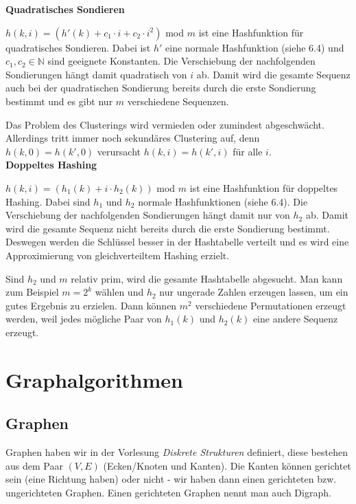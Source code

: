 \documentclass[12pt]{article}
\begin{document}
\textbf{Quadratisches Sondieren}

$h(k, i) = (h'(k) + c_1 \cdot{} i + c_2 \cdot{} i^2)$ mod $m$ ist eine Hashfunktion für quadratisches Sondieren. Dabei ist $h'$ eine normale Hashfunktion (siehe 6.4) und $c_1, c_2 \in \mathbb{N}$ sind geeignete Konstanten. Die Verschiebung der nachfolgenden Sondierungen hängt damit quadratisch von $i$ ab. Damit wird die gesamte Sequenz auch bei der quadratischen Sondierung bereits durch die erste Sondierung bestimmt und es gibt nur $m$ verschiedene Sequenzen.

Das Problem des Clusterings wird vermieden oder zumindest abgeschwächt. Allerdings tritt immer noch sekundäres Clustering auf, denn $h(k,0) = h(k',0)$ verursacht $h(k,i) = h(k',i)$ für alle $i$.\\

\textbf{Doppeltes Hashing}

$h(k, i) = (h_1(k) + i \cdot{} h_2(k))$ mod $m$ ist eine Hashfunktion für doppeltes Hashing. Dabei sind $h_1$ und $h_2$ normale Hashfunktionen (siehe 6.4). Die Verschiebung der nachfolgenden Sondierungen hängt damit nur von $h_2$ ab. Damit wird die gesamte Sequenz nicht bereits durch die erste Sondierung bestimmt. Deswegen werden die Schlüssel besser in der Hashtabelle verteilt und es wird eine Approximierung von gleichverteiltem Hashing erzielt.

Sind $h_2$ und $m$ relativ prim, wird die gesamte Hashtabelle abgesucht. Man kann zum Beispiel $m = 2^k$ wählen und $h_2$ nur ungerade Zahlen erzeugen lassen, um ein gutes Ergebnis zu erzielen. Dann können $m^2$ verschiedene Permutationen erzeugt werden, weil jedes mögliche Paar von $h_1(k)$ und $h_2(k)$ eine andere Sequenz erzeugt.

\section{Graphalgorithmen}

\subsection{Graphen}

Graphen haben wir in der Vorlesung \textit{Diskrete Strukturen} definiert, diese bestehen aus dem Paar $(V, E)$ (Ecken/Knoten und Kanten). Die Kanten können gerichtet sein (eine Richtung haben) oder nicht - wir haben dann einen gerichteten bzw. ungerichteten Graphen. Einen gerichteten Graphen nennt man auch Digraph.
\end{document}

